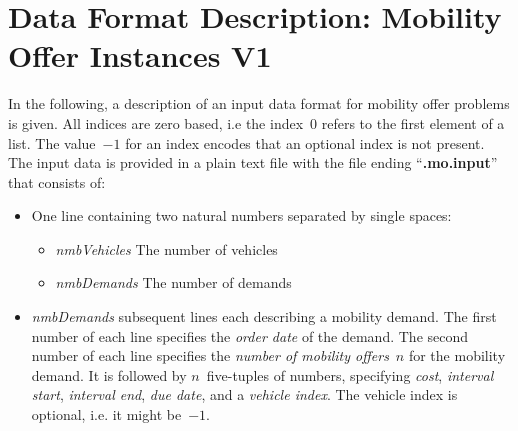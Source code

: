\documentclass[11pt,paper=a4]{article}
\begin{document}
\section*{Data Format Description: Mobility Offer Instances V1}

In the following, a description of an input data format for
mobility offer problems is given.
All indices are zero based, i.e the index~0 refers to the first element of a list.
The value~$-1$ for an index encodes that an optional index is not present.
The input data is provided in a plain text file
with the file ending \enquote{{\bf .mo.input}} that consists of:

\begin{itemize}
	\item One line containing two natural numbers
		  separated by single spaces:
		\begin{itemize}
			\item \emph{nmbVehicles} The number of vehicles
			\item \emph{nmbDemands} The number of demands
		\end{itemize}

	\item \emph{nmbDemands} subsequent lines each describing a mobility demand.
		The first number of each line specifies the \emph{order date} of the demand.
		The second number of each line specifies the \emph{number of mobility offers}~$n$ for the mobility demand.
		It is followed by $n$~five-tuples of numbers, specifying
		\emph{cost},
		\emph{interval start},
		\emph{interval end},
		\emph{due date},
		and a \emph{vehicle index}.
		The vehicle index is optional, i.e. it might be~$-1$.
\end{itemize}
\end{document}
